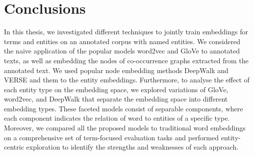 \chapter{Conclusions}\label{chap:concl}

In this thesis, we investigated different techniques to jointly train embeddings for terms and entities on an annotated corpus with named entities. We considered the naive application of the popular models word2vec and GloVe to annotated texts, as well as embedding the nodes of co-occurrence graphs extracted from the annotated text. We  used popular node embedding methods DeepWalk and VERSE and  them to  the entity embeddings. Furthermore, to analyse the effect of each entity type on the embedding space, we explored variations of GloVe, word2vec, and DeepWalk that separate the embedding space into different embedding types. These faceted models consist of separable components, where each component indicates the relation of  word to entities of a specific type. Moreover, we compared all the proposed models to traditional word embeddings on a comprehensive set of term-focused evaluation tasks and performed entity-centric exploration to identify the strengths and weaknesses of each approach. 
